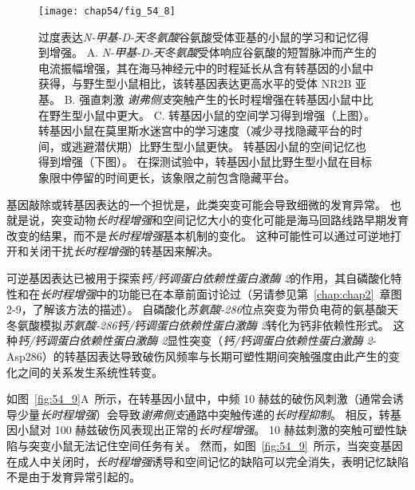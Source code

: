 \begin{figure}[htbp]
	\centering
	\texttt{[image: chap54/fig\_54\_8]}
	\caption{过度表达\textit{N-甲基-D-天冬氨酸}谷氨酸受体亚基的小鼠的学习和记忆得到增强。
		A. \textit{N-甲基-D-天冬氨酸}受体响应谷氨酸的短暂脉冲而产生的电流振幅增强，其在海马神经元中的时程延长从含有转基因的小鼠中获得，与野生型小鼠相比，该转基因表达更高水平的受体 NR2B 亚基。
		B. 强直刺激 \textit{谢弗侧支}突触产生的长时程增强在转基因小鼠中比在野生型小鼠中更大。
		C. 转基因小鼠的空间学习得到增强（上图）。
		转基因小鼠在莫里斯水迷宫中的学习速度（减少寻找隐藏平台的时间，或逃避潜伏期）比野生型小鼠更快。
		转基因小鼠的空间记忆也得到增强（下图）。
		在探测试验中，转基因小鼠比野生型小鼠在目标象限中停留的时间更长，该象限之前包含隐藏平台。}
	\label{fig:54_8}
\end{figure}


基因敲除或转基因表达的一个担忧是，此类突变可能会导致细微的发育异常。
也就是说，突变动物\textit{长时程增强}和空间记忆大小的变化可能是海马回路线路早期发育改变的结果，而不是\textit{长时程增强}基本机制的变化。
这种可能性可以通过可逆地打开和关闭干扰\textit{长时程增强}的转基因来解决。


可逆基因表达已被用于探索\textit{钙/钙调蛋白依赖性蛋白激酶 2}的作用，其自磷酸化特性和在\textit{长时程增强}中的功能已在本章前面讨论过（另请参见第~\ref{chap:chap2}~章图 2-9，了解该方法的描述）。
自磷酸化\textit{苏氨酸-286}位点突变为带负电荷的氨基酸天冬氨酸模拟\textit{苏氨酸-286}\textit{钙/钙调蛋白依赖性蛋白激酶 2}转化为钙非依赖性形式。
这种\textit{钙/钙调蛋白依赖性蛋白激酶 2}显性突变（\textit{钙/钙调蛋白依赖性蛋白激酶 2}-Asp286）的转基因表达导致破伤风频率与长期可塑性期间突触强度由此产生的变化之间的关系发生系统性转变。


如图~\ref{fig:54_9}A~所示，在转基因小鼠中，中频 10 赫兹的破伤风刺激（通常会诱导少量\textit{长时程增强}）会导致\textit{谢弗侧支}通路中突触传递的\textit{长时程抑制}。
相反，转基因小鼠对 100 赫兹破伤风表现出正常的\textit{长时程增强}。
10 赫兹刺激的突触可塑性缺陷与突变小鼠无法记住空间任务有关。
然而，如图~\ref{fig:54_9}~所示，当突变基因在成人中关闭时，\textit{长时程增强}诱导和空间记忆的缺陷可以完全消失，表明记忆缺陷不是由于发育异常引起的。


